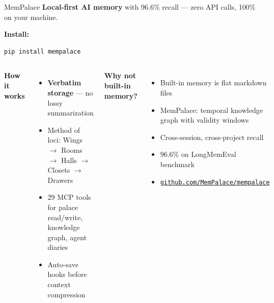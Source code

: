 \documentclass[aspectratio=169]{beamer}
\begin{document}
\begin{frame}[fragile]{MemPalace}
\textbf{Local-first AI memory} with 96.6\% recall --- zero API calls, 100\% on your machine.

\smallskip
\textbf{Install:}
\begin{lstlisting}[language=bash]
pip install mempalace
\end{lstlisting}

\begin{columns}[T]
\textbf{\color{popblue}How it works}
\begin{itemize}
  \item \textbf{Verbatim storage} --- no lossy summarization
  \item Method of loci: Wings $\to$ Rooms $\to$ Halls $\to$ Closets $\to$ Drawers
  \item 29 MCP tools for palace read/write, knowledge graph, agent diaries
  \item Auto-save hooks before context compression
\end{itemize}

\textbf{\color{paramgreen}Why not built-in memory?}
\begin{itemize}
  \item Built-in memory is flat markdown files
  \item MemPalace: temporal knowledge graph with validity windows
  \item Cross-session, cross-project recall
  \item 96.6\% on LongMemEval benchmark
  \item \href{https://github.com/MemPalace/mempalace}{\texttt{github.com/MemPalace/mempalace}}
\end{itemize}
\end{columns}
\end{frame}
\end{document}
